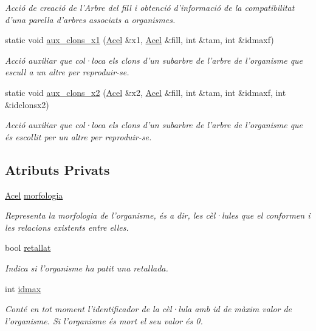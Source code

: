 \begin{DoxyCompactItemize}
\begin{DoxyCompactList}\small\item\em Acció de creació de l'Arbre del fill i obtenció d'informació de la compatibilitat d'una parella d'arbres associats a organismes. \end{DoxyCompactList}\item 
static void \hyperlink{class_organisme_ac7d5375d049b554778f5b2769618160d}{aux\-\_\-clons\-\_\-x1} (\hyperlink{class_organisme_a6322ecf5313caa7df794a33c4fc58f4e}{Acel} \&x1, \hyperlink{class_organisme_a6322ecf5313caa7df794a33c4fc58f4e}{Acel} \&fill, int \&tam, int \&idmaxf)
\begin{DoxyCompactList}\small\item\em Acció auxiliar que col·loca els clons d'un subarbre de l'arbre de l'organisme que escull a un altre per reproduir-\/se. \end{DoxyCompactList}\item 
static void \hyperlink{class_organisme_ab6232adf26f92b75902f25fccdd91a13}{aux\-\_\-clons\-\_\-x2} (\hyperlink{class_organisme_a6322ecf5313caa7df794a33c4fc58f4e}{Acel} \&x2, \hyperlink{class_organisme_a6322ecf5313caa7df794a33c4fc58f4e}{Acel} \&fill, int \&tam, int \&idmaxf, int \&idclonsx2)
\begin{DoxyCompactList}\small\item\em Acció auxiliar que col·loca els clons d'un subarbre de l'arbre de l'organisme que és escollit per un altre per reproduir-\/se. \end{DoxyCompactList}\end{DoxyCompactItemize}
\subsection*{Atributs Privats}
\begin{DoxyCompactItemize}
\item 
\hyperlink{class_organisme_a6322ecf5313caa7df794a33c4fc58f4e}{Acel} \hyperlink{class_organisme_a4f36183d9fb514405176208f7d3f6a96}{morfologia}
\begin{DoxyCompactList}\small\item\em Representa la morfologia de l'organisme, és a dir, les cèl·lules que el conformen i les relacions existents entre elles. \end{DoxyCompactList}\item 
bool \hyperlink{class_organisme_acf912225a83570cb68542dcc6709023a}{retallat}
\begin{DoxyCompactList}\small\item\em Indica si l'organisme ha patit una retallada. \end{DoxyCompactList}\item 
int \hyperlink{class_organisme_a09a3d9937c91142b69b8d682c5804f37}{idmax}
\begin{DoxyCompactList}\small\item\em Conté en tot moment l'identificador de la cèl·lula amb id de màxim valor de l'organisme. Si l'organisme és mort el seu valor és 0. \end{DoxyCompactList}\end{DoxyCompactItemize}


